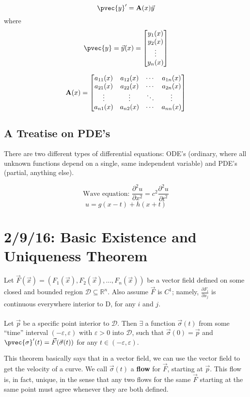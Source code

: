 \documentclass[12pt]{article}
\begin{document}
\[ 
\pvec{y}' = {\bf A}(x)\vec{y} 
\]
where 
\[
\pvec{y} = \vec{y}(x) = 
\begin{bmatrix}
y_1(x) \\
y_2(x) \\
\vdots \\
y_n(x)
\end{bmatrix}
\]

\[
{\bf A}(x) = 
\begin{bmatrix}
a_{11}(x) & a_{12}(x) & \cdots & a_{1n}(x) \\
a_{21}(x) & a_{22}(x) & \cdots & a_{2n}(x) \\
\vdots & \vdots & \ddots & \vdots \\ 
a_{n1}(x) & a_{n2}(x) & \cdots & a_{nn}(x) 
\end{bmatrix}
\]

\subsection{A Treatise on PDE's}
There are two different types of differential equations: ODE's (ordinary, where all unknown functions depend on a single, same independent variable) and PDE's (partial, anything else). 

\[ \text{Wave equation: } \frac{\partial^2u}{\partial x^2} = c^2 \frac{\partial^2u}{\partial t^2} \]
\[ u = g(x-t) + h(x+t) \]

\section{2/9/16: Basic Existence and Uniqueness Theorem}

\begin{theorem}
Let $\vec{F}(\vec{x}) = (F_1(\vec{x}),F_2(\vec{x}), \dots, F_n(\vec{x}))$ be a vector field defined on some closed and bounded region $\mathcal{D} \subseteq \mathbb{R}^n$. Also assume $\vec{F}$ is $C^1$; namely, $\frac{\partial F_i}{\partial x_j}$ is continuous everywhere interior to D, for any $i$ and $j$. \\ \\
Let $\vec{p}$ be a specific point interior to $\mathcal{D}$. Then $\exists$ a function $\vec{\sigma}(t)$ from some ``time'' interval $(-\varepsilon, \varepsilon)$ with $\varepsilon > 0$ into $\mathcal{D}$, such that $\vec{\sigma}(0) = \vec{p}$ and $\pvec{\sigma}'(t) = \vec{F}(\vec{\sigma}(t))$ for any $t \in (-\varepsilon, \varepsilon)$.
\end{theorem}

This theorem basically says that in a vector field, we can use the vector field to get the velocity of a curve. We call $\vec{\sigma}(t)$ a \textbf{flow} for $\vec{F}$, starting at $\vec{p}$. This flow is, in fact, unique, in the sense that any two flows for the same $\vec{F}$ starting at the same point must agree whenever they are both defined.
\end{document}
